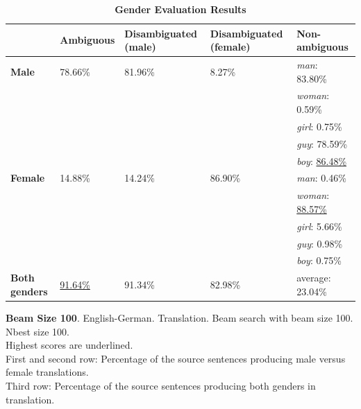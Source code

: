 \begin{table}[!htb]
    \begin{subtable}{\textwidth}
        \centering
        \begin{tabularx}{\linewidth}{|X|XXXX|}
            \hline
             & \textbf{Ambiguous} & \textbf{Disambiguated (male)} & \textbf{Disambiguated (female)} & \textbf{Non-ambiguous} \\ \hline
             \textbf{Male} & 78.66\% & 81.96\% & 8.27\% & \textit{man}: 83.80\% \\
             &&&& \textit{woman}: 0.59\% \\
             &&&& \textit{girl}: 0.75\% \\
             &&&& \textit{guy}: 78.59\% \\
             &&&& \textit{boy}: \underline{86.48\%} \\ \hline
             \textbf{Female} & 14.88\% & 14.24\% & 86.90\% & \textit{man}: 0.46\% \\ 
             &&&& \textit{woman}: \underline{88.57\%} \\
             &&&& \textit{girl}: 5.66\% \\
             &&&& \textit{guy}: 0.98\% \\
             &&&& \textit{boy}: 0.75\% \\\hline
             \textbf{Both genders} & \underline{91.64\%} & 91.34\% & 82.98\% & average: 23.04\% \\ \hline
        \end{tabularx}
        \caption{\textbf{Beam Size 100}. English-German. Translation. Beam search with beam size 100. Nbest size 100. \\ Highest scores are underlined. \\ First and second row: Percentage of the source sentences producing male versus female translations. \\ Third row: Percentage of the source sentences producing both genders in translation.}
        \label{tab:gender_percent_100}
    \end{subtable}
    \caption{\textbf{Gender Evaluation Results}}
    \label{tab:gender_percent}
\end{table}

